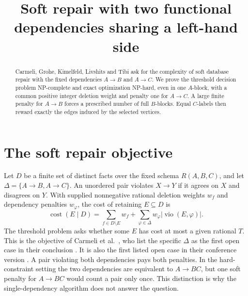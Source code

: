 \documentclass[11pt,a4paper]{amsart}
\title[Soft repair with a common left-hand side]{Soft repair with two functional dependencies sharing a left-hand side}
\date{}
\newcommand{\cost}{\operatorname{cost}}
\newcommand{\vio}{\operatorname{vio}}
\begin{document}
\begin{abstract}
Carmeli, Grohe, Kimelfeld, Livshits and Tibi ask for the complexity of soft database repair with the fixed dependencies $A\to B$ and $A\to C$. We prove the threshold decision problem NP-complete and exact optimization NP-hard, even in one $A$-block, with a common positive integer deletion weight and penalty one for $A\to C$. A large finite penalty for $A\to B$ forces a prescribed number of full $B$-blocks. Equal $C$-labels then reward exactly the edges induced by the selected vertices.
\end{abstract}
\maketitle

\section{The soft repair objective}
Let $D$ be a finite set of distinct facts over the fixed schema $R(A,B,C)$, and let $\Delta=\{A\to B,A\to C\}$. An unordered pair violates $X\to Y$ if it agrees on $X$ and disagrees on $Y$. With supplied nonnegative rational deletion weights $w_f$ and dependency penalties $w_\varphi$, the cost of retaining $E\subseteq D$ is
\[
  \cost(E\mid D)=\sum_{f\in D\setminus E}w_f+
          \sum_{\varphi\in\Delta}w_\varphi|\vio(E,\varphi)|.
\]
The threshold problem asks whether some $E$ has cost at most a given rational $T$. This is the objective of Carmeli et al.\ \cite[Equation~(1)]{journal}, who list the specific $\Delta$ as the first open case in their conclusion \cite[Section~7]{journal}. It is also the first listed open case in their conference version \cite[Section~6, p.~16:16]{conference}. A pair violating both dependencies pays both penalties. In the hard-constraint setting the two dependencies are equivalent to $A\to BC$, but one soft penalty for $A\to BC$ would count a pair only once. This distinction is why the single-dependency algorithm does not answer the question.
\end{document}
